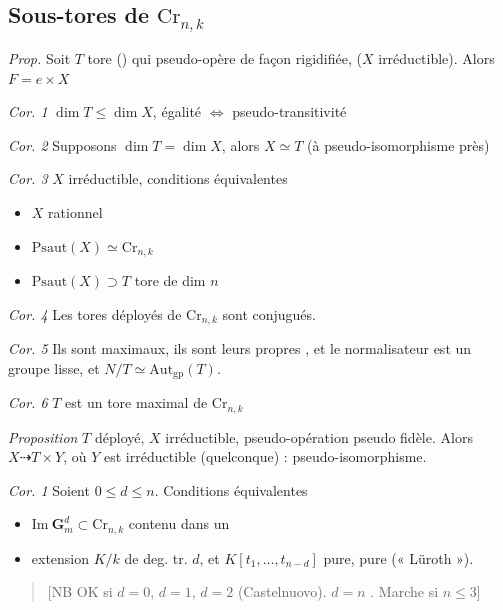 \documentclass[11pt,a4paper]{article}
\begin{document}
\subsection*{Sous-tores de $\mathrm{Cr}_{n,k}$}

\emph{Prop.} Soit $T$ tore () qui pseudo-opère de façon
\struck{\ill{}} rigidifiée, ($X$ irréductible). Alors $F = e \times X$
\struck{\ill{}}

\emph{Cor. 1} $\dim T \leq \dim X$, égalité $\Longleftrightarrow$
pseudo-transitivité 

\emph{Cor. 2} Supposons $\dim T = \dim X$, alors $X \simeq T$ (à
pseudo-isomorphisme près)

\emph{Cor. 3} $X$ irréductible, \ill{} conditions équivalentes
\begin{itemize}
  \item[a)] $X$ rationnel
  \item[b)] $\mathrm{Psaut}(X) \simeq \mathrm{Cr}_{n,k}$
  \item[c)] $\mathrm{Psaut}(X) \supset T$ tore de dim $n$
\end{itemize}


\emph{Cor. 4} Les tores déployés  de $\mathrm{Cr}_{n,k}$ sont
conjugués.

\emph{Cor. 5} Ils sont maximaux, ils sont leurs propres \ill{}, et le
normalisateur est un groupe \struck{\ill{}} lisse, et $N/T \simeq
\mathrm{Aut}_{\mathrm{gp}}(T)$.

\emph{Cor. 6} $T$ est un tore maximal de $\mathrm{Cr}_{n,k}$

\emph{Proposition} $T$ déployé, $X$ irréductible, pseudo-opération pseudo
fidèle. Alors $X \dashrightarrow T \times Y$, où $Y$ est \ill{} irréductible
(quelconque) : pseudo-isomorphisme.

\emph{Cor. 1} Soient $0 \leq d \leq n$. Conditions équivalentes
\begin{itemize}
  \item[a)] $\mathrm{Im}\ \mathbf{G}_m^d \subset \mathrm{Cr}_{n,k}$ \ill{}
        contenu dans un \ill{}
  \item[b)] \ill{} extension $K/k$ de deg. tr. $d$, et $K[t_1,\ldots,t_{n-d}]$
        pure, \ill{} pure (« Lüroth »).
\end{itemize}

\begin{quote}
[NB \quad OK si $d = 0$, $d = 1$, $d = 2$ 
(Castelnuovo). $d = n$ . Marche si
$n \leq 3$]
\end{quote}
\end{document}
